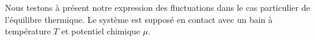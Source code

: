 Nous testons à présent notre expression des fluctuations dans le cas particulier de l'équilibre thermique. Le système est supposé en contact avec un bain à température \( T \) et potentiel chimique \( \mu \). 

%
%
%
%
%
%


